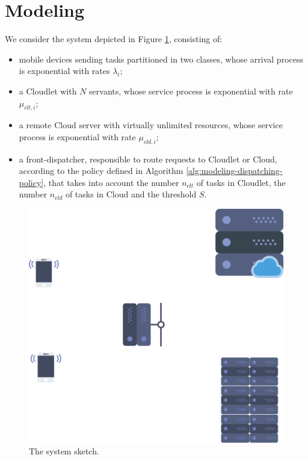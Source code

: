 \section{Modeling}
\label{sec:modeling}


We consider the system depicted in Figure \ref{fig:modeling-system-sketch}, consisting of:

\begin{itemize}
	\item  mobile devices sending tasks partitioned in two classes, whose arrival process is exponential with rates $\lambda_{i}$;
	\item a Cloudlet with $N$ servants, whose service process is exponential with rate  $\mu_{clt,i}$;
	\item a remote Cloud server with virtually unlimited resources, whose service process is exponential with rate  $\mu_{cld,i}$;
	\item a front-dispatcher, responsible to route requests to Cloudlet or Cloud, according to the policy defined in Algorithm \ref{alg:modeling-dispatching-policy}, that takes into account the number $n_{clt}$ of tasks in Cloudlet, the number $n_{cld}$ of tasks in Cloud and the threshold $S$.
\end{itemize}

\begin{figure}
	\label{fig:modeling-system-sketch}
	\includegraphics[width=\columnwidth]{fig/modeling-system-sketch}
	\caption{The system sketch.}
\end{figure}

